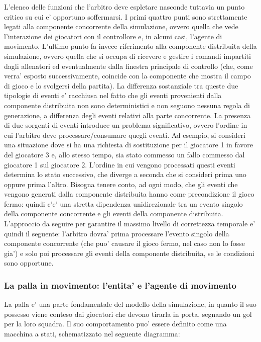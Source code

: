 L'elenco delle funzioni che l'arbitro deve espletare nasconde tuttavia un punto critico su cui e' opportuno soffermarsi. I primi quattro punti sono strettamente legati alla componente concorrente della simulazione, ovvero quella che vede l'interazione dei giocatori con il controllore e, in alcuni casi, l'agente di movimento. L'ultimo punto fa invece riferimento alla componente distribuita della simulazione, ovvero quella che si occupa di ricevere e gestire i comandi impartiti dagli allenatori ed eventualmente dalla finestra principale di controllo (che, come verra' esposto successivamente, coincide con la componente che mostra il campo di gioco e lo svolgersi della partita). La differenza sostanziale tra queste due tipologie di eventi e' racchiusa nel fatto che gli eventi provenienti dalla componente distribuita non sono deterministici e non seguono nessuna regola di generazione, a differenza degli eventi relativi alla parte concorrente.
La presenza di due sorgenti di eventi introduce un problema significativo, ovvero l'ordine in cui l'arbitro deve processare/consumare quegli eventi. Ad esempio, si consideri una situazione dove si ha una richiesta di sostituzione per il giocatore 1 in favore del giocatore 3 e, allo stesso tempo, sia stato commesso un fallo commesso dal giocatore 1 sul giocatore 2. L'ordine in cui vengono processati questi eventi determina lo stato successivo, che diverge a seconda che si consideri prima uno oppure prima l'altro. Bisogna tenere conto, ad ogni modo, che gli eventi che vengono generati dalla componente distribuita hanno come precondizione il gioco fermo: quindi c'e' una stretta dipendenza unidirezionale tra un evento singolo della componente concorrente e gli eventi della componente distribuita. L'approccio da seguire per garantire il massimo livello di correttezza temporale e' quindi il seguente: l'arbitro dovra' prima processare l'evento singolo della componente concorrente (che puo' causare il gioco fermo, nel caso non lo fosse gia') e solo poi processare gli eventi della componente distribuita, se le condizioni sono opportune.

\subsubsection{La palla in movimento: l'entita' e l'agente di movimento}
\label{sec:modello_palla_agente_movimento}


La palla e' una parte fondamentale del modello della simulazione, in quanto il suo possesso viene conteso dai giocatori che devono tirarla in porta, segnando un gol per la loro squadra. Il suo comportamento puo' essere definito come una macchina a stati, schematizzato nel seguente diagramma:

